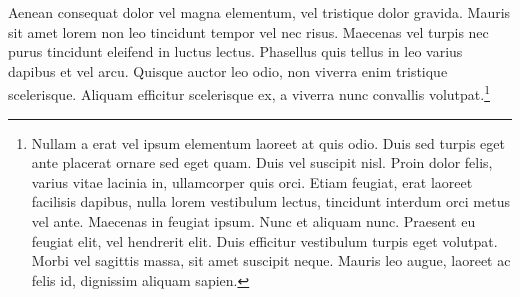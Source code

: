 Aenean consequat dolor vel magna elementum, vel tristique dolor gravida. Mauris sit amet lorem non leo tincidunt tempor vel nec risus. Maecenas vel turpis nec purus tincidunt eleifend in luctus lectus. Phasellus quis tellus in leo varius dapibus et vel arcu. Quisque auctor leo odio, non viverra enim tristique scelerisque. Aliquam efficitur scelerisque ex, a viverra nunc convallis volutpat.\footnote[4]{Nullam a erat vel ipsum elementum laoreet at quis odio. Duis sed turpis eget ante placerat ornare sed eget quam. Duis vel suscipit nisl. Proin dolor felis, varius vitae lacinia in, ullamcorper quis orci. Etiam feugiat, erat laoreet facilisis dapibus, nulla lorem vestibulum lectus, tincidunt interdum orci metus vel ante. Maecenas in feugiat ipsum. Nunc et aliquam nunc. Praesent eu feugiat elit, vel hendrerit elit. Duis efficitur vestibulum turpis eget volutpat. Morbi vel sagittis massa, sit amet suscipit neque. Mauris leo augue, laoreet ac felis id, dignissim aliquam sapien.}



